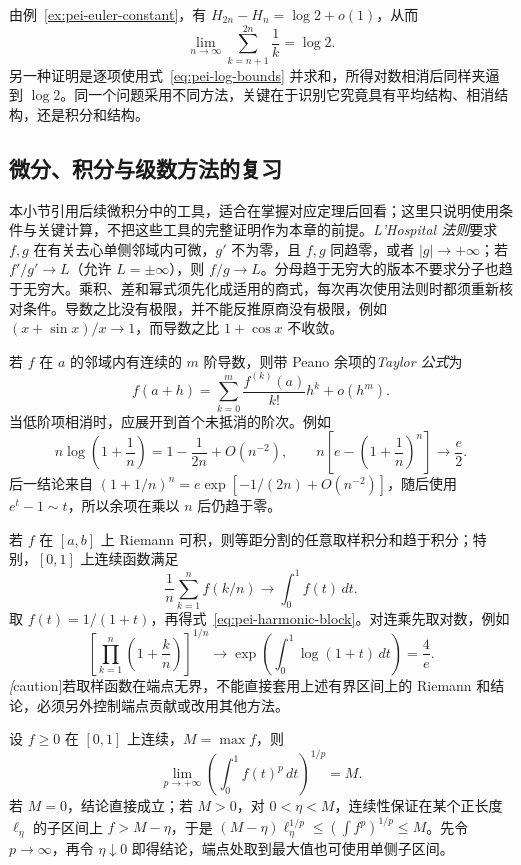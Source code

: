 由例~\ref{ex:pei-euler-constant}，有 $H_{2n}-H_n=\log2+o(1)$，从而
\begin{equation}
    \lim_{n\to\infty}\sum_{k=n+1}^{2n}\frac1k=\log2.
    \label{eq:pei-harmonic-block}
\end{equation}
另一种证明是逐项使用式~\eqref{eq:pei-log-bounds} 并求和，所得对数相消后同样夹逼到 $\log2$。同一个问题采用不同方法，关键在于识别它究竟具有平均结构、相消结构，还是积分和结构。

\subsection{微分、积分与级数方法的复习}

本小节引用后续微积分中的工具，适合在掌握对应定理后回看；这里只说明使用条件与关键计算，不把这些工具的完整证明作为本章的前提。\emph{L'Hospital 法则}要求 $f,g$ 在有关去心单侧邻域内可微，$g'$ 不为零，且 $f,g$ 同趋零，或者 $|g|\to+\infty$；若 $f'/g'\to L$（允许 $L=\pm\infty$），则 $f/g\to L$。分母趋于无穷大的版本不要求分子也趋于无穷大。乘积、差和幂式须先化成适用的商式，每次再次使用法则时都须重新核对条件。导数之比没有极限，并不能反推原商没有极限，例如 $(x+\sin x)/x\to1$，而导数之比 $1+\cos x$ 不收敛。

若 $f$ 在 $a$ 的邻域内有连续的 $m$ 阶导数，则带 Peano 余项的\emph{Taylor 公式}为
\[
    f(a+h)=\sum_{k=0}^m\frac{f^{(k)}(a)}{k!}h^k+o(h^m).
\]
当低阶项相消时，应展开到首个未抵消的阶次。例如
\[
    n\log\left(1+\frac1n\right)
    =1-\frac1{2n}+O(n^{-2}),\qquad
    n\left[e-\left(1+\frac1n\right)^n\right]\longrightarrow\frac e2.
\]
后一结论来自 $(1+1/n)^n=e\exp[-1/(2n)+O(n^{-2})]$，随后使用 $e^t-1\sim t$，所以余项在乘以 $n$ 后仍趋于零。

若 $f$ 在 $[a,b]$ 上 Riemann 可积，则等距分割的任意取样积分和趋于积分；特别，$[0,1]$ 上连续函数满足
\[
    \frac1n\sum_{k=1}^nf(k/n)\longrightarrow\int_0^1f(t)\,dt.
\]
取 $f(t)=1/(1+t)$，再得式~\eqref{eq:pei-harmonic-block}。对连乘先取对数，例如
\[
    \left[\prod_{k=1}^n\left(1+\frac kn\right)\right]^{1/n}
    \longrightarrow\exp\left(\int_0^1\log(1+t)\,dt\right)=\frac4e.
\]
\emph[caution]{若取样函数在端点无界，不能直接套用上述有界区间上的 Riemann 和结论}，必须另外控制端点贡献或改用其他方法。

设 $f\ge0$ 在 $[0,1]$ 上连续，$M=\max f$，则
\begin{equation}
    \lim_{p\to+\infty}\left(\int_0^1f(t)^p\,dt\right)^{1/p}=M.
    \label{eq:pei-lp-max}
\end{equation}
若 $M=0$，结论直接成立；若 $M>0$，对 $0<\eta<M$，连续性保证在某个正长度 $\ell_\eta$ 的子区间上 $f>M-\eta$，于是 $(M-\eta)\ell_\eta^{1/p}\le(\int f^p)^{1/p}\le M$。先令 $p\to\infty$，再令 $\eta\downarrow0$ 即得结论，端点处取到最大值也可使用单侧子区间。

